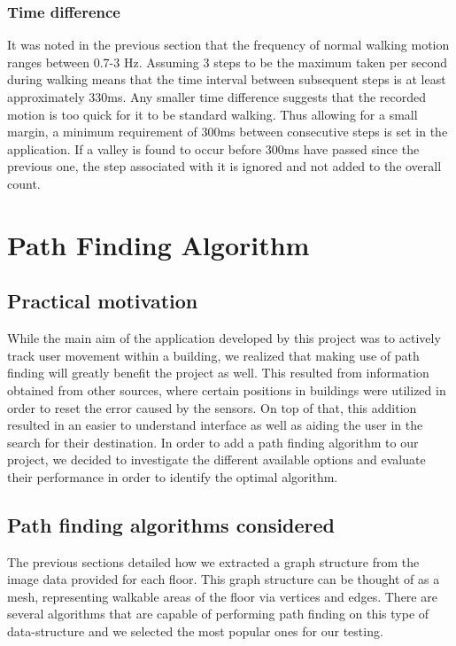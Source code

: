 \documentclass[12pt,a4paper]{report}
\begin{document}
\subsubsection{Time difference}

It was noted in the previous section that the frequency of normal walking motion ranges between 0.7-3 Hz. Assuming 3 steps to be the maximum taken per second during walking means that the time interval between subsequent steps is at least approximately 330ms. Any smaller time difference suggests that the recorded motion is too quick for it to be standard walking. Thus allowing for a small margin, a minimum requirement of 300ms between consecutive steps is set in the application. If a valley is found to occur before 300ms have passed since the previous one, the step associated with it is ignored and not added to the overall count.

\section{Path Finding Algorithm}

\subsection{Practical motivation}
While the main aim of the application developed by this project was to actively track user movement within a building, we realized that making use of path finding will greatly benefit the project as well. This resulted from information obtained from other sources, where certain positions in buildings were utilized in order to reset the error caused by the sensors. On top of that, this addition resulted in an easier to understand interface as well as aiding the user in the search for their destination. In order to add a path finding algorithm to our project, we decided to investigate the different available options and evaluate their performance in order to identify the optimal algorithm.

\subsection{Path finding algorithms considered}
The previous sections detailed how we extracted a graph structure from the image data provided for each floor. This graph structure can be thought of as a mesh, representing walkable areas of the floor via vertices and edges. There are several algorithms that are capable of performing path finding on this type of data-structure and we selected the most popular ones for our testing. 
\end{document}

